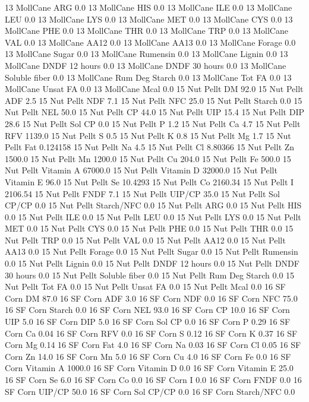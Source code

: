 \documentclass[letterpaper,10pt,english]{sphinxmanual}
\begin{document}
\begin{sphinxVerbatim}[commandchars=\\\{\},numbers=left,firstnumber=1,stepnumber=1]
13 MollCane ARG 0.0
13 MollCane HIS 0.0
13 MollCane ILE 0.0
13 MollCane LEU 0.0
13 MollCane LYS 0.0
13 MollCane MET 0.0
13 MollCane CYS 0.0
13 MollCane PHE 0.0
13 MollCane THR 0.0
13 MollCane TRP 0.0
13 MollCane VAL 0.0
13 MollCane AA\PYGZsh{}12 0.0
13 MollCane AA\PYGZsh{}13 0.0
13 MollCane \PYGZpc{} Forage 0.0
13 MollCane Sugar \PYGZpc{} 0.0
13 MollCane Rumensin 0.0
13 MollCane Lignin 0.0
13 MollCane DNDF 12 hours 0.0
13 MollCane DNDF 30 hours 0.0
13 MollCane Soluble fiber 0.0
13 MollCane Rum Deg Starch 0.0
13 MollCane Tot FA 0.0
13 MollCane Unsat FA 0.0
13 MollCane Mcal 0.0
15 Nut Pellt DM 92.0
15 Nut Pellt ADF 2.5
15 Nut Pellt NDF 7.1
15 Nut Pellt NFC 25.0
15 Nut Pellt Starch 0.0
15 Nut Pellt NEL 50.0
15 Nut Pellt CP 44.0
15 Nut Pellt UIP 15.4
15 Nut Pellt DIP 28.6
15 Nut Pellt Sol CP 0.0
15 Nut Pellt P 1.2
15 Nut Pellt Ca 4.7
15 Nut Pellt RFV 1139.0
15 Nut Pellt S 0.5
15 Nut Pellt K 0.8
15 Nut Pellt Mg 1.7
15 Nut Pellt Fat 0.124158
15 Nut Pellt Na 4.5
15 Nut Pellt Cl 8.80366
15 Nut Pellt Zn 1500.0
15 Nut Pellt Mn 1200.0
15 Nut Pellt Cu 204.0
15 Nut Pellt Fe 500.0
15 Nut Pellt Vitamin A 67000.0
15 Nut Pellt Vitamin D 32000.0
15 Nut Pellt Vitamin E 96.0
15 Nut Pellt Se 10.4293
15 Nut Pellt Co 2160.34
15 Nut Pellt I 2106.54
15 Nut Pellt FNDF 7.1
15 Nut Pellt UIP/CP 35.0
15 Nut Pellt Sol CP/CP 0.0
15 Nut Pellt Starch/NFC 0.0
15 Nut Pellt ARG 0.0
15 Nut Pellt HIS 0.0
15 Nut Pellt ILE 0.0
15 Nut Pellt LEU 0.0
15 Nut Pellt LYS 0.0
15 Nut Pellt MET 0.0
15 Nut Pellt CYS 0.0
15 Nut Pellt PHE 0.0
15 Nut Pellt THR 0.0
15 Nut Pellt TRP 0.0
15 Nut Pellt VAL 0.0
15 Nut Pellt AA\PYGZsh{}12 0.0
15 Nut Pellt AA\PYGZsh{}13 0.0
15 Nut Pellt \PYGZpc{} Forage 0.0
15 Nut Pellt Sugar \PYGZpc{} 0.0
15 Nut Pellt Rumensin 0.0
15 Nut Pellt Lignin 0.0
15 Nut Pellt DNDF 12 hours 0.0
15 Nut Pellt DNDF 30 hours 0.0
15 Nut Pellt Soluble fiber 0.0
15 Nut Pellt Rum Deg Starch 0.0
15 Nut Pellt Tot FA 0.0
15 Nut Pellt Unsat FA 0.0
15 Nut Pellt Mcal 0.0
16 SF Corn DM 87.0
16 SF Corn ADF 3.0
16 SF Corn NDF 0.0
16 SF Corn NFC 75.0
16 SF Corn Starch 0.0
16 SF Corn NEL 93.0
16 SF Corn CP 10.0
16 SF Corn UIP 5.0
16 SF Corn DIP 5.0
16 SF Corn Sol CP 0.0
16 SF Corn P 0.29
16 SF Corn Ca 0.04
16 SF Corn RFV 0.0
16 SF Corn S 0.12
16 SF Corn K 0.37
16 SF Corn Mg 0.14
16 SF Corn Fat 4.0
16 SF Corn Na 0.03
16 SF Corn Cl 0.05
16 SF Corn Zn 14.0
16 SF Corn Mn 5.0
16 SF Corn Cu 4.0
16 SF Corn Fe 0.0
16 SF Corn Vitamin A 1000.0
16 SF Corn Vitamin D 0.0
16 SF Corn Vitamin E 25.0
16 SF Corn Se 6.0
16 SF Corn Co 0.0
16 SF Corn I 0.0
16 SF Corn FNDF 0.0
16 SF Corn UIP/CP 50.0
16 SF Corn Sol CP/CP 0.0
16 SF Corn Starch/NFC 0.0

\end{sphinxVerbatim}
\end{document}
